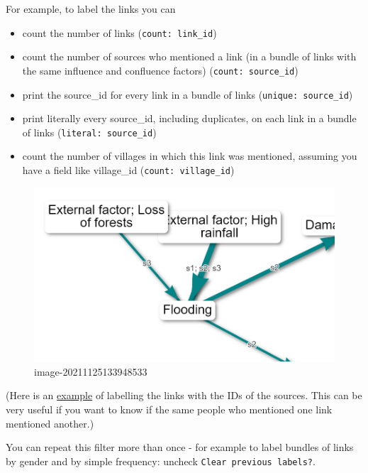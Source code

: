 \documentclass[
]{book}
\providecommand{\tightlist}{%
  \setlength{\itemsep}{0pt}\setlength{\parskip}{0pt}}
\begin{document}
For example, to label the links you can

\begin{itemize}
\tightlist
\item
  count the number of links (\texttt{count:\ link\_id})
\item
  count the number of sources who mentioned a link (in a bundle of links with the same influence and confluence factors) (\texttt{count:\ source\_id})
\item
  print the source\_id for every link in a bundle of links (\texttt{unique:\ source\_id})
\item
  print literally every source\_id, including duplicates, on each link in a bundle of links (\texttt{literal:\ source\_id})
\item
  count the number of villages in which this link was mentioned, assuming you have a field like village\_id (\texttt{count:\ village\_id})
\end{itemize}

\begin{figure}
\centering
\includegraphics[width=6.77083in,height=\textheight]{_assets/image-20211125133948533.png}
\caption{image-20211125133948533}
\end{figure}

(Here is an \href{causalmap.shinyapps.io/CausalMap2/?s=165}{example} of labelling the links with the IDs of the sources. This can be very useful if you want to know if the same people who mentioned one link mentioned another.)

You can repeat this filter more than once - for example to label bundles of links by gender and by simple frequency: uncheck \texttt{Clear\ previous\ labels?}.
\end{document}
